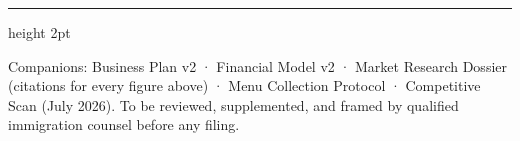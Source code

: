 \documentclass[10pt]{article}
\begin{document}
\vspace{10pt}
{\color{ground}\hrule height 2pt}
\vspace{4pt}
{\small\color{muted}Companions: Business Plan v2 · Financial Model v2 · Market Research Dossier (citations for every
figure above) · Menu Collection Protocol · Competitive Scan (July 2026). To be reviewed, supplemented, and framed by
qualified immigration counsel before any filing.}
\end{document}
